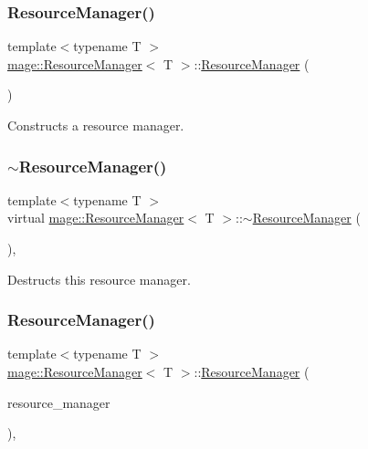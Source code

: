 \subsubsection{\texorpdfstring{Resource\+Manager()}{ResourceManager()}\hspace{0.1cm}{\footnotesize\ttfamily [1/2]}}
{\footnotesize\ttfamily template$<$typename T $>$ \\
\hyperlink{classmage_1_1_resource_manager}{mage\+::\+Resource\+Manager}$<$ T $>$\+::\hyperlink{classmage_1_1_resource_manager}{Resource\+Manager} (\begin{DoxyParamCaption}{ }\end{DoxyParamCaption})\hspace{0.3cm}{\ttfamily [default]}}

Constructs a resource manager. \hypertarget{classmage_1_1_resource_manager_a60685932f6c5f40333cd1e072a6f8c81}{}\label{classmage_1_1_resource_manager_a60685932f6c5f40333cd1e072a6f8c81} 
\subsubsection{\texorpdfstring{$\sim$\+Resource\+Manager()}{~ResourceManager()}}
{\footnotesize\ttfamily template$<$typename T $>$ \\
virtual \hyperlink{classmage_1_1_resource_manager}{mage\+::\+Resource\+Manager}$<$ T $>$\+::$\sim$\hyperlink{classmage_1_1_resource_manager}{Resource\+Manager} (\begin{DoxyParamCaption}{ }\end{DoxyParamCaption})\hspace{0.3cm}{\ttfamily [virtual]}, {\ttfamily [default]}}

Destructs this resource manager. \hypertarget{classmage_1_1_resource_manager_a3b424e1ef7f543a2705d1124018d9921}{}\label{classmage_1_1_resource_manager_a3b424e1ef7f543a2705d1124018d9921} 
\subsubsection{\texorpdfstring{Resource\+Manager()}{ResourceManager()}\hspace{0.1cm}{\footnotesize\ttfamily [2/2]}}
{\footnotesize\ttfamily template$<$typename T $>$ \\
\hyperlink{classmage_1_1_resource_manager}{mage\+::\+Resource\+Manager}$<$ T $>$\+::\hyperlink{classmage_1_1_resource_manager}{Resource\+Manager} (\begin{DoxyParamCaption}\item[{const \hyperlink{classmage_1_1_resource_manager}{Resource\+Manager}$<$ T $>$ \&}]{resource\+\_\+manager }\end{DoxyParamCaption})\hspace{0.3cm}{\ttfamily [private]}, {\ttfamily [delete]}}

